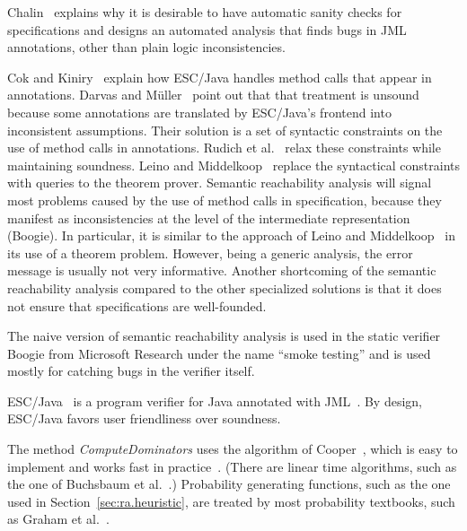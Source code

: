\documentclass[a4paper]{article}
\newcommand{\escjava}{ESC\slash Java\xspace}
\theoremstyle{slanted}
\theoremstyle{definition}
\theoremstyle{remark}
\begin{document}

Chalin~\cite{chalin2006} explains why it is desirable to have
automatic sanity checks for specifications and designs an
automated analysis that finds bugs in JML annotations, other than
plain logic inconsistencies.

Cok and Kiniry~\cite{cok2005methods,cok2004} explain how
\escjava handles method calls that appear in annotations. Darvas
and M\"uller~\cite{darvas2006methods} point out that that
treatment is unsound because some annotations are translated
by \escjava's frontend into inconsistent assumptions. Their
solution is a set of syntactic constraints on the use of
method calls in annotations. Rudich et al.~\cite{rudich2008}
relax these constraints while maintaining soundness. Leino and
Middelkoop~\cite{leino2009methods} replace the syntactical
constraints with queries to the theorem prover. Semantic
reachability analysis will signal most problems caused by the
use of method calls in specification, because they manifest as
inconsistencies at the level of the intermediate representation
(Boogie). In particular, it is similar to the approach of Leino
and Middelkoop~\cite{leino2009methods} in its use of a theorem
problem. However, being a generic analysis, the error message is
usually not very informative. Another shortcoming of the semantic
reachability analysis compared to the other specialized solutions
is that it does not ensure that specifications are well-founded.


The naive version of semantic reachability analysis is used in
the static verifier Boogie from Microsoft Research under the name
``smoke testing'' and is used mostly for catching bugs in the
verifier itself.


\escjava~\cite{flanagan2002escjava} is a program verifier for
Java annotated with JML~\cite{leavens2006jml,cok2004}. By design,
\escjava favors user friendliness over soundness.

The method \textit{ComputeDominators} uses the algorithm of
Cooper~\cite{cooper2000}, which is easy to implement and
works fast in practice~\cite{georgiadis2006}. (There are
linear time algorithms, such as the one of Buchsbaum et
al.~\cite{buchsbaum2008}.) Probability generating functions,
such as the one used in Section~\ref{sec:ra.heuristic}, are
treated by most probability textbooks, such as Graham et
al.~\cite[Chapter~8]{graham1998}.




\end{document}
